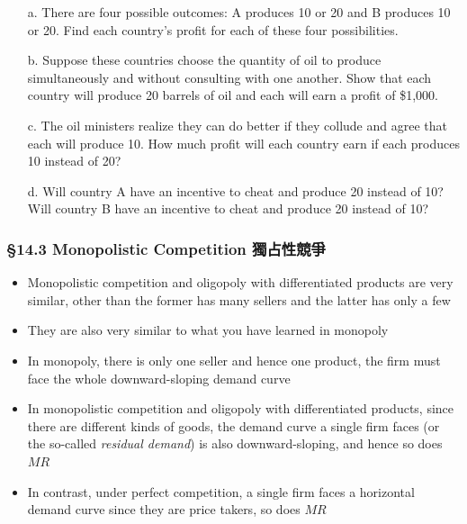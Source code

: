 \documentclass[12pt, xcolor=dvipsnames]{beamer}
\begin{document}
\begin{frame}
\small 
\begin{enumerate}\itemsep-0.5ex 
\item[a.] There are four possible outcomes: A produces 10 or 20 and B produces 10 or 20. Find each country’s profit for each of these four possibilities.
\item[b.] Suppose these countries choose the quantity of oil to produce simultaneously and without consulting with one another. Show that each country will produce 20 barrels of oil and each will earn a profit of \$1,000.
\item[c.] The oil ministers realize they can do better if they collude and agree that each will produce 10. How much profit will each country earn if each produces 10 instead of 20?
\item[d.] Will country A have an incentive to cheat and produce 20 instead of 10? Will country B have an incentive to cheat and produce 20 instead of 10?
\end{enumerate}
\end{frame}


\begin{frame}
\frametitle{\bf §14.3 Monopolistic Competition 獨占性競爭}
\begin{itemize}
\item Monopolistic competition and oligopoly with differentiated products are very similar, other than the former has many sellers and the latter has only a few
\item They are also very similar to what you have learned in monopoly
\item In monopoly, there is only one seller and hence one product, the firm must face the whole downward-sloping demand curve
\item In monopolistic competition and oligopoly with differentiated products, since there are different kinds of goods, the demand curve a single firm faces (or the so-called {\it residual demand}) is also downward-sloping, and hence so does $MR$
\item In contrast, under perfect competition, a single firm faces a horizontal demand curve since they are price takers, so does $MR$
\end{itemize}
\end{frame}
\end{document}
